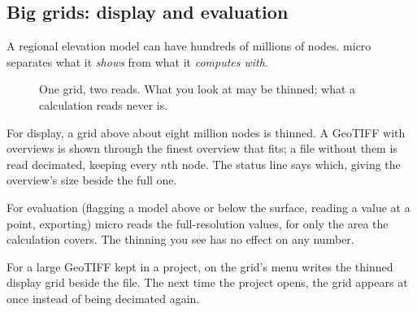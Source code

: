 \subsection{Big grids: display and evaluation}\label{sec:grids-big}

A regional elevation model can have hundreds of millions of nodes. micro separates what it \emph{shows} from what it \emph{computes with}.

\begin{figure}[htbp]\centering
{}
\caption{One grid, two reads. What you look at may be thinned; what a calculation reads never is.}\label{fig:grids-two-reads}
\end{figure}

For display, a grid above about eight million nodes is thinned. A GeoTIFF with overviews is shown through the finest overview that fits; a file without them is read decimated, keeping every $n$th node. The status line says which, giving the overview's size beside the full one.

For evaluation (flagging a model above or below the surface, reading a value at a point, exporting) micro reads the full-resolution values, for only the area the calculation covers. The thinning you see has no effect on any number.

\begin{tip}
For a large GeoTIFF kept in a project,  on the grid's menu writes the thinned display grid beside the file. The next time the project opens, the grid appears at once instead of being decimated again.
\end{tip}

